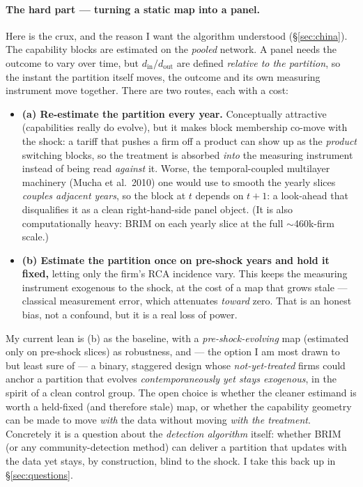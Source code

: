 \documentclass[11pt]{article}
\newcommand{\din}{d_{\mathrm{in}}}
\newcommand{\dout}{d_{\mathrm{out}}}
\begin{document}
\paragraph{The hard part --- turning a static map into a panel.} Here is the crux, and the
reason I want the algorithm understood (\S\ref{sec:china}). The capability blocks are
estimated on the \emph{pooled} network. A panel needs the outcome to vary over time, but
$\din/\dout$ are defined \emph{relative to the partition}, so the instant the partition
itself moves, the outcome and its own measuring instrument move together. There are two
routes, each with a cost:
\begin{itemize}[leftmargin=1.5em]
  \item \textbf{(a) Re-estimate the partition every year.} Conceptually attractive
        (capabilities really do evolve), but it makes block membership co-move with the
        shock: a tariff that pushes a firm off a product can show up as the \emph{product}
        switching blocks, so the treatment is absorbed \emph{into} the measuring instrument
        instead of being read \emph{against} it. Worse, the temporal-coupled multilayer
        machinery (Mucha et al.\ 2010) one would use to smooth the yearly slices
        \emph{couples adjacent years}, so the block at $t$ depends on $t{+}1$: a
        look-ahead that disqualifies it as a clean right-hand-side panel object. (It is
        also computationally heavy: BRIM on each yearly slice at the full $\sim$460k-firm
        scale.)
  \item \textbf{(b) Estimate the partition once on pre-shock years and hold it fixed,}
        letting only the firm's RCA incidence vary. This keeps the measuring instrument
        exogenous to the shock, at the cost of a map that grows stale --- classical
        measurement error, which attenuates \emph{toward} zero. That is an honest bias, not
        a confound, but it is a real loss of power.
\end{itemize}

\noindent My current lean is (b) as the baseline, with a \emph{pre-shock-evolving} map
(estimated only on pre-shock slices) as robustness, and --- the option I am most drawn to
but least sure of --- a binary, staggered design whose \emph{not-yet-treated} firms
could anchor a partition that evolves \emph{contemporaneously yet stays exogenous}, in the
spirit of a clean control group. The open choice is whether the cleaner estimand is worth a
held-fixed (and therefore stale) map, or whether the capability geometry can be made to move
\emph{with} the data without moving \emph{with the treatment}. Concretely it is a question
about the \emph{detection algorithm} itself: whether BRIM (or any community-detection
method) can deliver a partition that updates with the data yet stays, by construction, blind
to the shock. I take this back up in \S\ref{sec:questions}.
\end{document}
